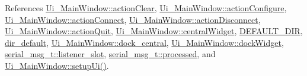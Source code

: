References \hyperlink{a00052_source_l00048}{Ui\+\_\+\+Main\+Window\+::action\+Clear}, \hyperlink{a00052_source_l00047}{Ui\+\_\+\+Main\+Window\+::action\+Configure}, \hyperlink{a00052_source_l00044}{Ui\+\_\+\+Main\+Window\+::action\+Connect}, \hyperlink{a00052_source_l00045}{Ui\+\_\+\+Main\+Window\+::action\+Disconnect}, \hyperlink{a00052_source_l00046}{Ui\+\_\+\+Main\+Window\+::action\+Quit}, \hyperlink{a00052_source_l00052}{Ui\+\_\+\+Main\+Window\+::central\+Widget}, \hyperlink{a00039_source_l00020}{D\+E\+F\+A\+U\+L\+T\+\_\+\+D\+I\+R}, \hyperlink{a00039_source_l00063}{dir\+\_\+default}, \hyperlink{a00052_source_l00185}{Ui\+\_\+\+Main\+Window\+::dock\+\_\+central}, \hyperlink{a00052_source_l00176}{Ui\+\_\+\+Main\+Window\+::dock\+Widget}, \hyperlink{a00001_source_l00496}{serial\+\_\+msg\+\_\+t\+::listener\+\_\+slot}, \hyperlink{a00001_source_l00494}{serial\+\_\+msg\+\_\+t\+::processed}, and \hyperlink{a00052_source_l00192}{Ui\+\_\+\+Main\+Window\+::setup\+Ui()}.


